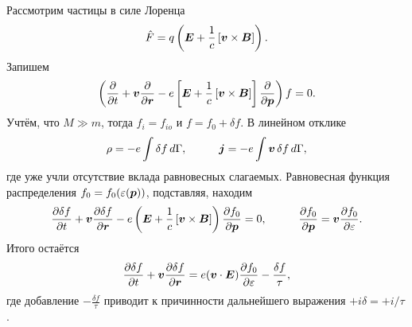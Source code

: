 Рассмотрим частицы в силе Лоренца
\begin{equation*}
	\hat{F} = q \left(
		\boldsymbol{E} + \frac{1}{c} \left[ \boldsymbol{v} \times  \boldsymbol{B} \right]
	\right).
\end{equation*}
Запишем
\begin{equation*}
	\left(
		\frac{\partial }{\partial t} + \boldsymbol{v} \frac{\partial }{\partial \boldsymbol{r}} - e \left[
			\boldsymbol{E} + \frac{1}{c} \left[\boldsymbol{v} \times  \boldsymbol{B}\right]
		\right] \frac{\partial }{\partial \boldsymbol{p}} 
	\right) f = 0.
\end{equation*}
Учтём, что $M \gg m$, тогда $f_i = f_{io}$  и $f = f_0 + \delta f$. В линейном отклике
\begin{equation*}
	\rho = - e \int \delta f \d \Gamma,
	\hspace{10 mm} 
	\vc{j} = - e \int \vc{v} \, \delta f  \d \Gamma,
\end{equation*}
где уже учли отсутствие вклада равновесных слагаемых. Равновесная функция распределения $f_0 = f_0 (\varepsilon(\boldsymbol{p}))$, подставляя, находим
\begin{equation*}
	\frac{\partial \delta f}{\partial t} + \vc{v} \frac{\partial \delta f}{\partial \vc{r}} - e\left(
		\vc{E} + \frac{1}{c}  \left[\vc{v} \times  \vc{B}\right]
	\right) \frac{\partial f_0}{\partial \vc{p}} = 0,
	\hspace{10 mm} 
	\frac{\partial f_0}{\partial \vc{p}} = \vc{v} \frac{\partial f_0}{\partial \varepsilon}.
\end{equation*}
Итого остаётся 
\begin{equation*}
	\frac{\partial \delta f}{\partial t}  + \boldsymbol{v} \frac{\partial \delta f}{\partial \boldsymbol{r}} = e (\boldsymbol{v} \cdot \boldsymbol{E}) \frac{\partial f_0}{\partial \varepsilon} - \frac{\delta f}{\tau},
\end{equation*}
где добавление $- \frac{\delta f}{\tau}$ приводит к причинности дальнейшего выражения $+ i \delta = + i / \tau$. 


